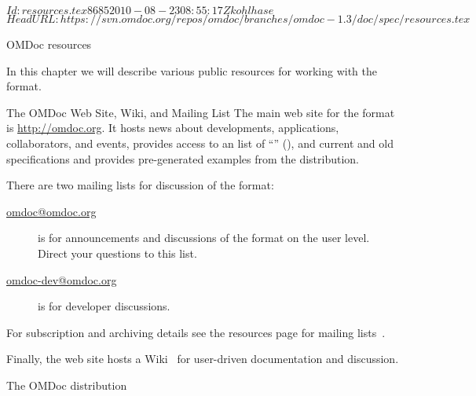 \svnInfo $Id: resources.tex 8685 2010-08-23 08:55:17Z kohlhase $
\svnKeyword $HeadURL: https://svn.omdoc.org/repos/omdoc/branches/omdoc-1.3/doc/spec/resources.tex $

\begin{tchapter}[id=resources]{OMDoc resources}

In this chapter we will describe various public resources for working with the
{\omdoc} format.

\begin{tsection}[id=website]{The OMDoc Web Site, Wiki, and Mailing List}
  The main web site for the {\omdoc} format is \url{http://omdoc.org}.  It
  hosts news about developments, applications, collaborators, and events, provides access
  to an list of ``'' ({}), and
  current and old {\omdoc} specifications and provides pre-generated examples from the
  {\omdoc} distribution.
  
  There are two mailing lists for discussion of the {\omdoc} format: 
  \begin{description}
  \item[\url{omdoc@omdoc.org}] is for announcements and discussions of the {\omdoc}
    format on the user level. Direct your questions to this list.
  \item[\url{omdoc-dev@omdoc.org}] is for developer discussions.
  \end{description}
  For subscription and archiving details see the {\omdoc} resources page for mailing
  lists~\cite{OMDoc-mailinglists:URL}.
  
  Finally, the {\omdoc} web site hosts a Wiki~\cite{OMDoc:wiki} for user-driven
  documentation and discussion.
\end{tsection}

\begin{tsection}[id=distribution]{The OMDoc distribution}
  

\end{tsection}
\end{tchapter}
